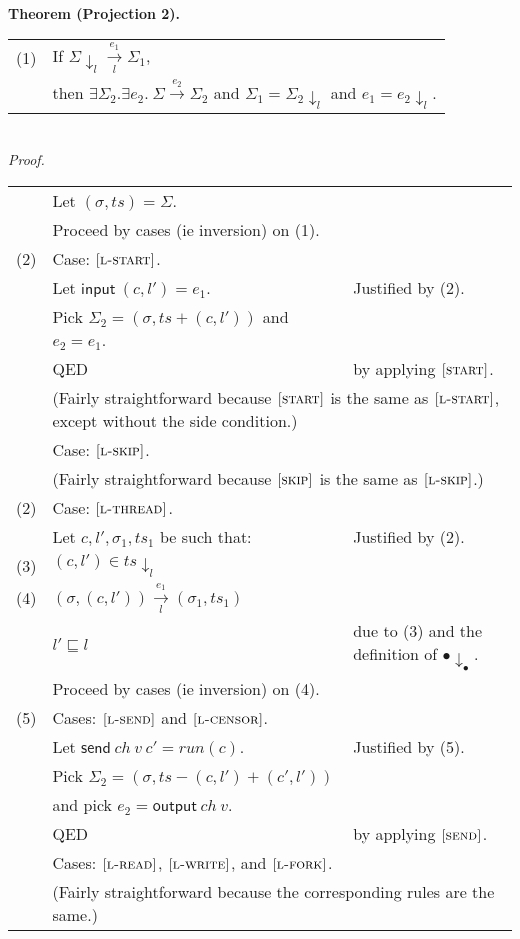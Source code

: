 \documentclass{article}
\newcommand{\rn}[1]{\text{\textsc{[#1]}}}
\newcommand{\ssteparrow}[1]{\overset{#1}{\longrightarrow}}
\newcommand{\sstep}[3]{#2\ssteparrow{#1}#3}
\newcommand{\ltsteparrow}[2]{\overset{#2}{\underset{#1}{\longrightarrow}}}
\newcommand{\ltstep}[4]{#3\ltsteparrow{#1}{#2}#4}
\newcommand{\lssteparrow}[2]{\overset{#2}{\underset{#1}{\longrightarrow}}}
\newcommand{\lsstep}[4]{#3\lssteparrow{#1}{#2}#4}
\newcommand{\hole}{{\bullet}}
\newcommand{\thread}[2]{(#1,#2)}
\newcommand{\opsend}[3]{\textsf{send}~#1~#2~#3}
\newcommand{\evstart}[1]{\textsf{input}~#1}
\newcommand{\evsend}[2]{\textsf{output}~#1~#2}
\newcommand{\proj}[2]{#1{\downarrow_{#2}}}
\begin{document}
\\
\textbf{Theorem (Projection 2).}
\\
\begin{tabular}{l@{$\qquad$}l}
  (1) & If $\lsstep{l}{e_1}{\proj{\Sigma}{l}}{\Sigma_1}$,
\\
      & then $\exists \Sigma_2.\exists e_2.~\sstep{e_2}{\Sigma}{\Sigma_2}$
        and $\Sigma_1 = \proj{\Sigma_2}{l}$
        and $e_1 = \proj{e_2}{l}$.
\end{tabular}
\\
\textit{Proof.}
\\
\begin{tabular}{l@{$\qquad$}l@{\qquad}l}
        & Let $(\sigma,ts)=\Sigma$.
\\
        & Proceed by cases (ie inversion) on (1).
\\
  (2)   & Case: $\rn{l-start}$.
\\
        & \z Let $\evstart{\thread{c}{l'}}=e_1$.
        & Justified by (2).
\\
        & \z Pick $\Sigma_2 = (\sigma,ts+\thread{c}{l'})$ and $e_2=e_1$.
\\
        & \z QED
        & by applying $\rn{start}$.
\\
        & \multicolumn{2}{l}{\z (Fairly straightforward because $\rn{start}$ is the same as $\rn{l-start}$, except without the side condition.)}
\\
        & Case: $\rn{l-skip}$.
\\
        & \multicolumn{2}{l}{\z (Fairly straightforward because $\rn{skip}$ is the same as $\rn{l-skip}$.)}
\\
  (2)   & Case: $\rn{l-thread}$.
\\
        & \z Let $c,l',\sigma_1,ts_1$ be such that:
        & Justified by (2).
\\
  (3)   & \z \z $\thread{c}{l'}\in\proj{ts}{l}$
\\
  (4)   & \z \z $\ltstep{l}{e_1}{(\sigma,\thread{c}{l'})}{(\sigma_1,ts_1)}$
\\
        & \z $l'\sqsubseteq l$
        & due to (3) and the definition of $\proj{\hole}{\hole}$.
\\
        & \z Proceed by cases (ie inversion) on (4).
\\
  (5)   & \z Cases: $\rn{l-send}$ and $\rn{l-censor}$.
\\
        & \z \z Let $\opsend{ch}{v}{c'}=run(c)$.
        & Justified by (5).
\\
        & \z \z Pick $\Sigma_2 = (\sigma,ts-\thread{c}{l'}+\thread{c'}{l'})$
\\
        & \z \z and pick $e_2 = \evsend{ch}{v}$.
\\
        & \z \z QED
        & by applying $\rn{send}$.
\\
        & \z Cases: $\rn{l-read}$, $\rn{l-write}$, and $\rn{l-fork}$.
\\
        & \multicolumn{2}{l}{\z \z (Fairly straightforward because the corresponding rules are the same.)}
\end{tabular}
\end{document}
